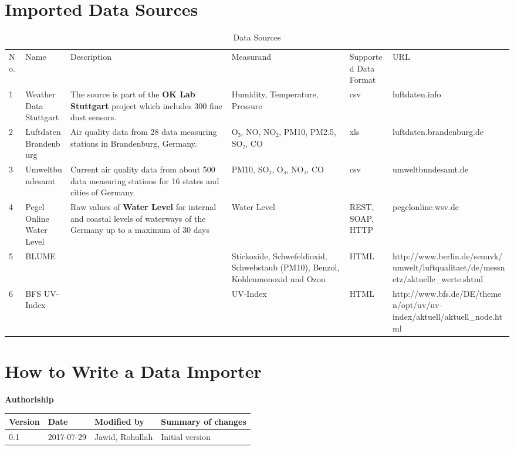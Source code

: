 \documentclass{llncs}
\begin{document}
\begin{thebibliography}{}  %

%
%

\appendix

\section{Imported Data Sources}

\begin{table}[]
\centering
\caption{Data Sources}
\label{data_sources}
\begin{tabular}{llllll}
 No. & Name  & Description & Measurand & Supported Data Format & URL \\
 1 & Weather Data Stuttgart & The source is part of the \textbf{OK Lab Stuttgart} project which includes 300 fine dust sensors. & Humidity, Temperature, Pressure &csv & luftdaten.info \\
 2 & Luftdaten Brandenburg & Air quality data from 28 data measuring stations in Brandenburg, Germany. & O₃, NO, NO₂, PM10, PM2.5, SO₂, CO & xls & luftdaten.brandenburg.de \\
 3 & Umweltbundesamt & Current air quality data from about 500 data measuring stations for 16 states and cities of Germany. & PM10, SO₂, O₃, NO₂, CO & csv &  umweltbundesamt.de \\
 4 & Pegel Online Water Level & Raw values of \textbf{Water Level} for internal and coastal levels of waterways of the Germany up to a maximum of 30 days & Water Level & REST, SOAP, HTTP & pegelonline.wsv.de \\
 5 & BLUME &  & Stickoxide, Schwefeldioxid, Schwebstaub (PM10), Benzol, Kohlenmonoxid und Ozon & HTML & http://www.berlin.de/senuvk/umwelt/luftqualitaet/de/messnetz/aktuelle_werte.shtml \\
 6 & BFS UV-Index &  & UV-Index & HTML & http://www.bfs.de/DE/themen/opt/uv/uv-index/aktuell/aktuell_node.html
\end{tabular}
\end{table}

\section{How to Write a Data
Importer}\label{how-to-write-a-data-importer}

\textbf{Authoriship}

\begin{longtable}[]{@{}llll@{}}
\toprule
Version & Date & Modified by & Summary of changes\tabularnewline
\midrule
\endhead
0.1 & 2017-07-29 & Jawid, Rohullah & Initial version\tabularnewline
\bottomrule
\end{longtable}


\end{thebibliography}
\end{document}
